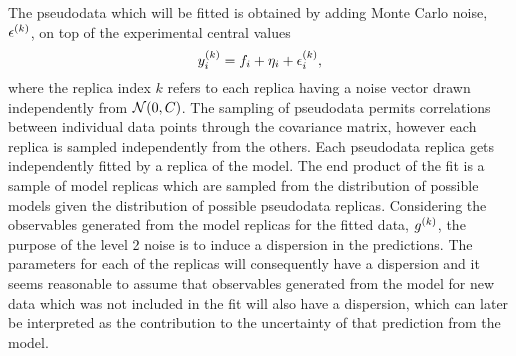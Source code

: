 The pseudodata which will be fitted is obtained by adding Monte Carlo
noise, $\epsilon^{(k)}$, on top of the experimental central values
\begin{equation}
    y^{(k)}_{i} = f_i + \eta_i + \epsilon^{(k)}_{i},
\end{equation}
where the replica index $k$ refers to each replica having a noise vector drawn
independently from $\mathcal{N}(0, C)$. The sampling of pseudodata permits
correlations between individual data points through the covariance matrix,
however each replica is sampled independently from the others.
Each pseudodata replica gets independently fitted by a replica of the model.
The end product of the fit is a sample of model replicas which are sampled from
the distribution of possible models given the distribution of possible
pseudodata replicas. Considering the observables generated from the model replicas
for the fitted data, $g^{(k)}$, the purpose of the level 2 noise
is to induce a dispersion in the predictions. The parameters for each of the
replicas will consequently have a dispersion and it seems reasonable to assume
that observables generated from the model for new data which was not included
in the fit will also have a dispersion, which can later be interpreted as the
contribution to the uncertainty of that prediction from the model.

